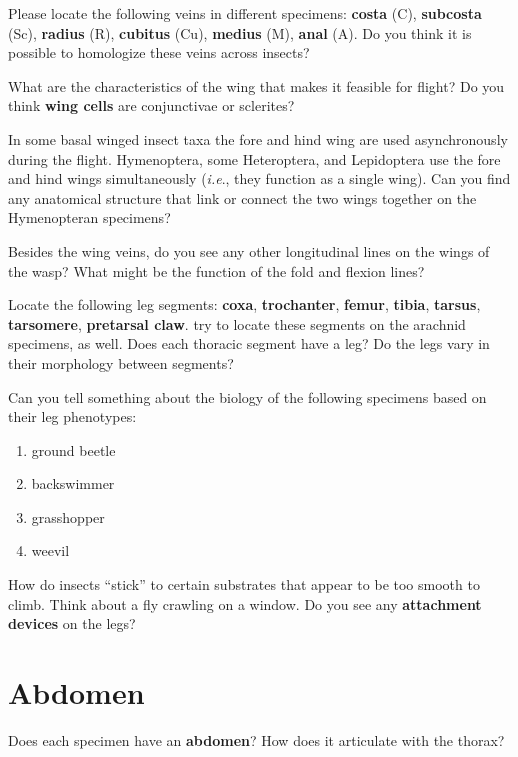 \documentclass[letterpaper, 11pt]{article}
\begin{document}
\noindent{}Please locate the following veins in different specimens: \textbf{costa} (C), \textbf{subcosta} (Sc), \textbf{radius} (R), \textbf{cubitus} (Cu), \textbf{medius} (M), \textbf{anal} (A). Do you think it is possible to homologize these veins across insects? 
\vspace{30 mm}


\noindent{}What are the characteristics of the wing that makes it feasible for flight? Do you think \textbf{wing cells} are conjunctivae or sclerites?
\vspace{30 mm}


\noindent{}In some basal winged insect taxa the fore and hind wing are used asynchronously during the flight. Hymenoptera, some Heteroptera, and Lepidoptera use the fore and hind wings simultaneously (\textit{i.e}., they function as a single wing). Can you find any anatomical structure that link or connect the two wings together on the Hymenopteran specimens? 
\vspace{30 mm}

\noindent{}Besides the wing veins, do you see any other longitudinal lines on the wings of the wasp? What might be the function of the fold and flexion lines?
\vspace{30 mm}

\noindent{}Locate the following leg segments: \textbf{coxa}, \textbf{trochanter}, \textbf{femur}, \textbf{tibia}, \textbf{tarsus}, \textbf{tarsomere}, \textbf{pretarsal claw}. try to locate these segments on the arachnid specimens, as well. Does each thoracic segment have a leg? Do the legs vary in their morphology between segments? 
\vspace{30 mm}

\noindent{}Can you tell something about the biology of the following specimens based on their leg phenotypes:
\begin{enumerate}
\item ground beetle
\item backswimmer
\item grasshopper
\item weevil
\end{enumerate}

\noindent{}How do insects ``stick'' to certain substrates that appear to be too smooth to climb. Think about a fly crawling on a window. Do you see any \textbf{attachment devices} on the legs?

\section*{Abdomen}
Does each specimen have an \textbf{abdomen}? How does it articulate with the thorax?
\vspace{25 mm}
\end{document}
